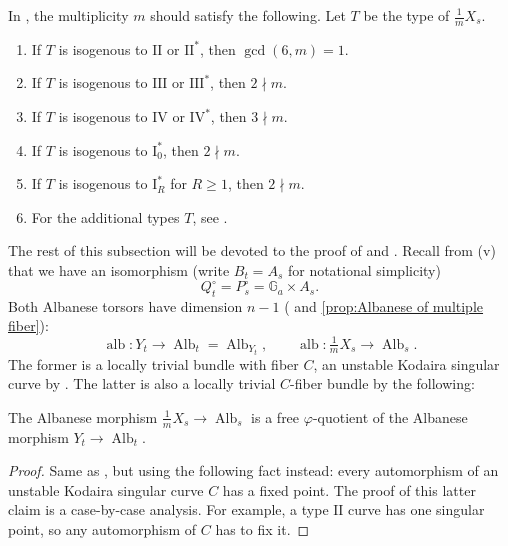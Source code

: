 \documentclass[reqno, letterpaper]{amsart}
\numberwithin{equation}{subsection}
\let\to\longrightarrow
\newcommand{\GG}{\mathbb{G}}
\DeclareMathOperator{\Alb}{Alb}
\DeclareMathOperator{\alb}{alb}
\begin{document}
		\begin{proposition} \label{prop:classification of multiple fiber v multiplicity}
			In , the multiplicity $m$ should satisfy the following. Let $T$ be the type of $\frac{1}{m} X_s$.
			\begin{enumerate}
				\item If $T$ is isogenous to $\mathrm{II}$ or $\mathrm{II}^*$, then $\gcd (6, m) = 1$.
				\item If $T$ is isogenous to $\mathrm{III}$ or $\mathrm{III}^*$, then $2 \nmid m$.
				\item If $T$ is isogenous to $\mathrm{IV}$ or $\mathrm{IV}^*$, then $3 \nmid m$.
				\item If $T$ is isogenous to $\mathrm I_0^*$, then $2 \nmid m$.
				\item If $T$ is isogenous to $\mathrm I_R^*$ for $R \ge 1$, then $2 \nmid m$.
				\item For the additional types $T$, see .
			\end{enumerate}
		\end{proposition}
		
		The rest of this subsection will be devoted to the proof of  and . Recall from (v) that we have an isomorphism (write $B_t = A_s$ for notational simplicity)
		\[ Q_t^\circ = P_s^\circ = \GG_a \times A_s .\]
		Both Albanese torsors have dimension $n-1$ ( and \ref{prop:Albanese of multiple fiber}):
		\[ \alb : Y_t \to \Alb_t = \Alb_{Y_t} ,\qquad \alb : \tfrac{1}{m}X_s \to \Alb_s .\]
		The former is a locally trivial bundle with fiber $C$, an unstable Kodaira singular curve by . The latter is also a locally trivial $C$-fiber bundle by the following:
		
		\begin{lemma} \label{lem:multiple fiber v:albanese}
			The Albanese morphism $\frac{1}{m}X_s \to \Alb_s$ is a free $\varphi$-quotient of the Albanese morphism $Y_t \to \Alb_t$.
		\end{lemma}
		\begin{proof}
			Same as , but using the following fact instead: every automorphism of an unstable Kodaira singular curve $C$ has a fixed point. The proof of this latter claim is a case-by-case analysis. For example, a type $\mathrm {II}$ curve has one singular point, so any automorphism of $C$ has to fix it.
		\end{proof}
		
\end{document}
